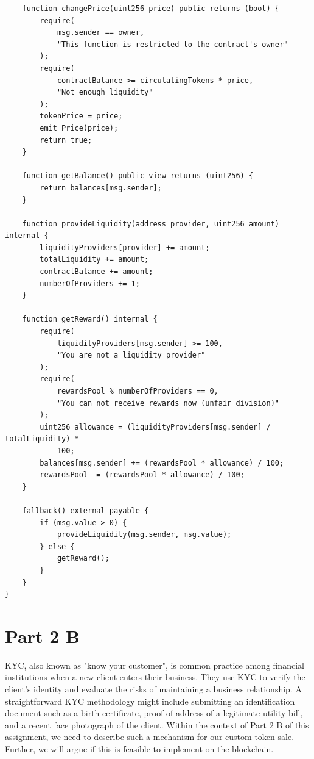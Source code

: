 \documentclass[12pt,a4paper]{article}
\begin{document}
\begin{lstlisting}
    function changePrice(uint256 price) public returns (bool) {
        require(
            msg.sender == owner,
            "This function is restricted to the contract's owner"
        );
        require(
            contractBalance >= circulatingTokens * price,
            "Not enough liquidity"
        );
        tokenPrice = price;
        emit Price(price);
        return true;
    }

    function getBalance() public view returns (uint256) {
        return balances[msg.sender];
    }

    function provideLiquidity(address provider, uint256 amount) internal {
        liquidityProviders[provider] += amount;
        totalLiquidity += amount;
        contractBalance += amount;
        numberOfProviders += 1;
    }

    function getReward() internal {
        require(
            liquidityProviders[msg.sender] >= 100,
            "You are not a liquidity provider"
        );
        require(
            rewardsPool % numberOfProviders == 0,
            "You can not receive rewards now (unfair division)"
        );
        uint256 allowance = (liquidityProviders[msg.sender] / totalLiquidity) *
            100;
        balances[msg.sender] += (rewardsPool * allowance) / 100;
        rewardsPool -= (rewardsPool * allowance) / 100;
    }

    fallback() external payable {
        if (msg.value > 0) {
            provideLiquidity(msg.sender, msg.value);
        } else {
            getReward();
        }
    }
}
\end{lstlisting}

\section*{Part 2 B}

KYC, also known as  "know your customer", is common practice among financial
institutions when a new client enters their business. They use KYC to verify the
client's identity and evaluate the risks of maintaining a business relationship.
A straightforward KYC methodology might include submitting an identification
document such as a birth certificate, proof of address of a legitimate utility
bill, and a recent face photograph of the client. Within the context of Part 2 B
of this assignment, we need to describe such a mechanism for our custom token
sale. Further, we will argue if this is feasible to implement on the blockchain. \\
\end{document}
